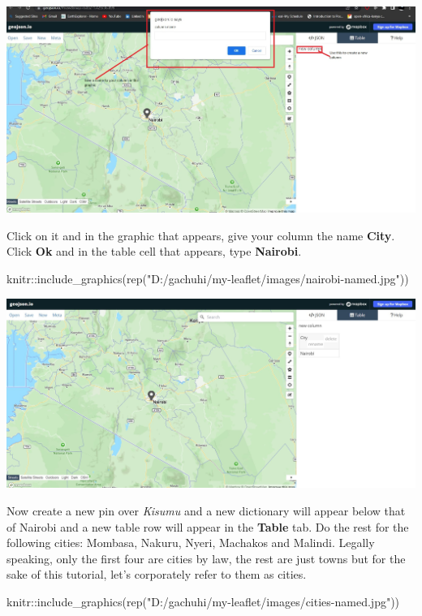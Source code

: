 \documentclass[
]{book}
\newenvironment{Shaded}{\begin{snugshade}}{\end{snugshade}}
\newcommand{\FunctionTok}[1]{\textcolor[rgb]{0.00,0.00,0.00}{#1}}
\newcommand{\NormalTok}[1]{#1}
\newcommand{\SpecialCharTok}[1]{\textcolor[rgb]{0.00,0.00,0.00}{#1}}
\newcommand{\StringTok}[1]{\textcolor[rgb]{0.31,0.60,0.02}{#1}}
\begin{document}
\includegraphics[width=26.56in]{../images/table}

Click on it and in the graphic that appears, give your column the name \textbf{City}. Click \textbf{Ok} and in the table cell that appears, type \textbf{Nairobi}.

\begin{Shaded}
\begin{Highlighting}[]
\NormalTok{knitr}\SpecialCharTok{::}\FunctionTok{include\_graphics}\NormalTok{(}\FunctionTok{rep}\NormalTok{(}\StringTok{"D:/gachuhi/my{-}leaflet/images/nairobi{-}named.jpg"}\NormalTok{))}
\end{Highlighting}
\end{Shaded}

\includegraphics[width=26.67in]{../images/nairobi-named}

Now create a new pin over \emph{Kisumu} and a new dictionary will appear below that of Nairobi and a new table row will appear in the \textbf{Table} tab. Do the rest for the following cities: Mombasa, Nakuru, Nyeri, Machakos and Malindi. Legally speaking, only the first four are cities by law, the rest are just towns but for the sake of this tutorial, let's corporately refer to them as cities.

\begin{Shaded}
\begin{Highlighting}[]
\NormalTok{knitr}\SpecialCharTok{::}\FunctionTok{include\_graphics}\NormalTok{(}\FunctionTok{rep}\NormalTok{(}\StringTok{"D:/gachuhi/my{-}leaflet/images/cities{-}named.jpg"}\NormalTok{))}
\end{Highlighting}
\end{Shaded}
\end{document}
